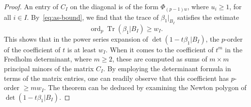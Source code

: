\documentclass{amsart}
\numberwithin{equation}{section}
\theoremstyle{plain}
\theoremstyle{definition}
\newtheorem{remark}[equation]{Remark}
\begin{document}
\begin{proof}
An entry of \(C_{I}\) on the diagonal is of the form
\(\Phi_{(p-1)u}\), where \(u_{i}\geq 1\), for all \(i\in I\).
By~\eqref{eq:as-bound}, we find that the trace of
\(\beta_{1}|_{B_{I}}\) satisfies the estimate
\begin{equation*}
\operatorname{ord}_{p}\operatorname{Tr}(\beta_{1}| B_{I}) \geq w_{I}.
\end{equation*}
This shows that in the power series expansion of
\(\det(1-t\beta_{1}| B_{I})\), the \(p\)-order of the coefficient
of \(t\) is at least \(w_{I}\).  When it comes to the coefficient of
\(t^{m}\) in the Fredholm determinant, where \(m\geq 2\), these are
computed as sums of \(m\times m\) principal minors of the matrix
\(C_{I}\).  By employing the determinant formula in terms of the
matrix entries, one can readily observe that this coefficient has
\(p\)-order \(\geq mw_{I}\).  The theorem can be deduced by examining
the Newton polygon of \(\det(1-t\beta_{1}| B_{I})\).
\end{proof}

\end{document}
